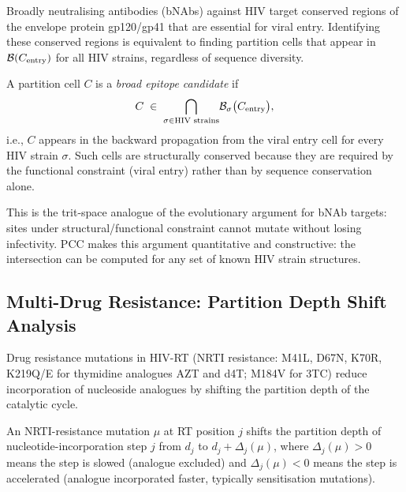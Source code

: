 Broadly neutralising antibodies (bNAbs) against HIV target conserved
regions of the envelope protein gp120/gp41 that are essential for viral
entry.  Identifying these conserved regions is equivalent to finding
partition cells that appear in $\mathcal{B}(C_{\mathrm{entry}})$ for all
HIV strains, regardless of sequence diversity.

\begin{proposition}
\label{prop:ch05-vaccine}
A partition cell $C$ is a \emph{broad epitope candidate} if
\begin{equation}
\label{eq:ch05-vaccine}
    C \;\in\; \bigcap_{\sigma \in \text{HIV strains}}\!
    \mathcal{B}_\sigma\bigl(C_{\mathrm{entry}}\bigr),
\end{equation}
i.e., $C$ appears in the backward propagation from the viral entry cell
for every HIV strain $\sigma$.  Such cells are structurally conserved
because they are required by the functional constraint (viral entry) rather
than by sequence conservation alone.
\end{proposition}

This is the trit-space analogue of the evolutionary argument for bNAb
targets: sites under structural/functional constraint cannot mutate without
losing infectivity.  PCC makes this argument quantitative and constructive:
the intersection  can be computed for any set
of known HIV strain structures.

\subsection{Multi-Drug Resistance: Partition Depth Shift Analysis}

Drug resistance mutations in HIV-RT (NRTI resistance: M41L, D67N, K70R,
K219Q/E for thymidine analogues AZT and d4T; M184V for 3TC) reduce
incorporation of nucleoside analogues by shifting the partition depth of
the catalytic cycle.

\begin{proposition}
\label{prop:ch05-resistance}
An NRTI-resistance mutation $\mu$ at RT position $j$ shifts the partition
depth of nucleotide-incorporation step $j$ from $d_j$ to $d_j + \Delta_j(\mu)$,
where $\Delta_j(\mu) > 0$ means the step is slowed (analogue excluded) and
$\Delta_j(\mu) < 0$ means the step is accelerated (analogue incorporated
faster, typically sensitisation mutations).
\end{proposition}

